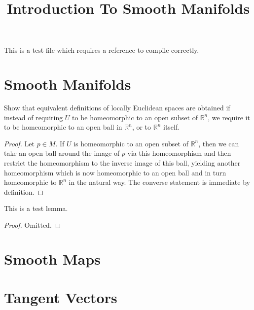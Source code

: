 


%


\title{Introduction To Smooth Manifolds}


\maketitle

\label{section-phantom}

\tableofcontents

This is a test file which requires a reference to compile correctly. \cite{Maclane}

\section{Smooth Manifolds}
\label{section-smooth-manifolds}

\begin{exercise}
\label{sm-exercise-1-1}
Show that equivalent definitions of locally Euclidean spaces are obtained if
instead of requiring $U$ to be homeomorphic to an open subset of $\mathbb R^n$,
we require it to be homeomorphic to an open ball in $\mathbb R^n$, or to
$\mathbb R^n$ itself.
\end{exercise}

\begin{proof}
Let $p \in M$. If $U$ is homeomorphic to an open subset of $\mathbb R^n$, then
we can take an open ball around the image of $p$ via this homeomorphism and
then restrict the homeomorphism to the inverse image of this ball, yielding
another homeomorphism which is now homeomorphic to an open ball and in turn
homeomorphic to $\mathbb R^n$ in the natural way. The converse statement is
immediate by definition.
\end{proof}

\begin{lemma}
\label{test-lemma}
This is a test lemma.

\end{lemma}

\begin{proof}
Omitted.
\end{proof}

\section{Smooth Maps}
\label{section-smooth-maps}

\section{Tangent Vectors}
\label{section-tangent-vectors}

